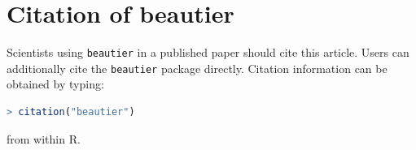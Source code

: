 \documentclass{article}
\begin{document}
\section{Citation of beautier}

Scientists using \verb;beautier; in a published paper should cite this
article. Users can additionally cite the \verb;beautier; package 
directly. Citation information can be obtained by typing:

\begin{lstlisting}[language=R]
> citation("beautier")
\end{lstlisting}

from within R.




\begin{thebibliography}{}

\end{thebibliography}
\end{document}
